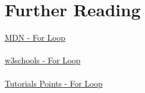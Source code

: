 \documentclass[12pt, letterpaper]{article}
\begin{document}
\section*{Further Reading}

\href{https://developer.mozilla.org/en-US/docs/Web/JavaScript/Reference/Statements/for}{MDN - For Loop}\\
\\
\href{http://www.w3schools.com/js/js_loop_for.asp}{w3schools - For Loop}\\
\\
\href{https://www.tutorialspoint.com/javascript/javascript_for_loop.htm}{Tutorials Points - For Loop}
\end{document}
